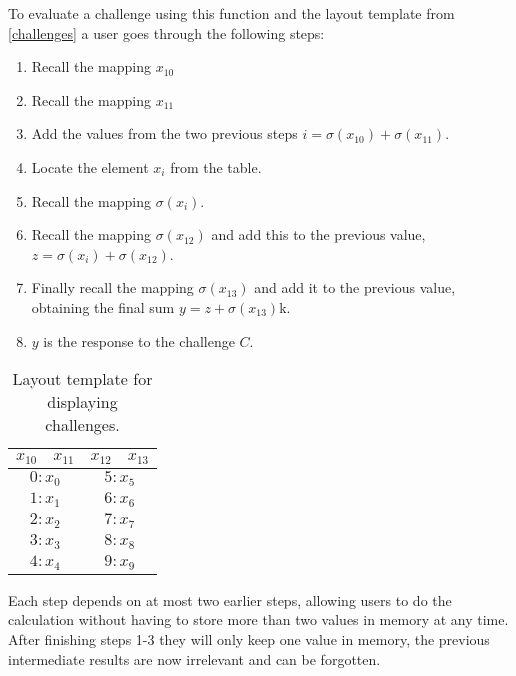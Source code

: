 To evaluate a challenge using this function and the layout template from \autoref{challenges} a user goes through the following steps:
\begin{enumerate}
    \item Recall the mapping $x_{10}$
    \item Recall the mapping $x_{11}$ 
    \item Add the values from the two previous steps $i = \sigma(x_{10}) + \sigma(x_{11})$.
    \item Locate the element $x_i$ from the table.
    \item Recall the mapping $\sigma(x_i)$.
    \item Recall the mapping $\sigma(x_{12})$ and add this to the previous value, $z = \sigma(x_i) + \sigma(x_{12})$.
    \item Finally recall the mapping $\sigma(x_{13})$ and add it to the previous value, obtaining the final sum $y = z + \sigma(x_{13})$k.
    \item $y$ is the response to the challenge $C$.
\end{enumerate}


\begin{table}[h]
    \centering
    \begin{tabular}{|c c|c|c|}
        \hline
        $x_{10}$ & $x_{11}$ & $x_{12}$ & $x_{13}$ \\
        \hline \hline
        \multicolumn{2}{|c|}{$0:x_0$} & \multicolumn{2}{|c|}{$5:x_5$}\\
        \multicolumn{2}{|c|}{$1:x_1$} & \multicolumn{2}{|c|}{$6:x_6$}\\
        \multicolumn{2}{|c|}{$2:x_2$} & \multicolumn{2}{|c|}{$7:x_7$}\\
        \multicolumn{2}{|c|}{$3:x_3$} & \multicolumn{2}{|c|}{$8:x_8$}\\
        \multicolumn{2}{|c|}{$4:x_4$} & \multicolumn{2}{|c|}{$9:x_9$}\\
        \hline 
    \end{tabular}
    \caption{Layout template for displaying challenges.}
    \label{challenges}
\end{table}


\par Each step depends on at most two earlier steps, allowing users to do the calculation without having to store more than two values in memory at any time. After finishing steps 1-3 they will only keep one value in memory, the previous intermediate results are now irrelevant and can be forgotten. 

